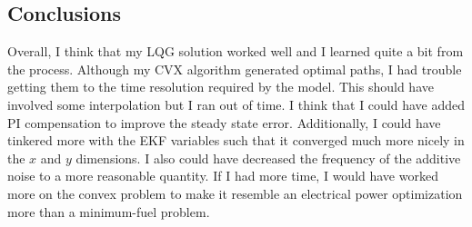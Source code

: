 \documentclass[conf]{new-aiaa}
\begin{document}
\begin{doublespace}
\section{Conclusions}
Overall, I think that my LQG solution worked well and I learned quite a bit from the process. Although my CVX algorithm generated optimal paths, I had trouble getting them to the time resolution required by the model. This should have involved some interpolation but I ran out of time. I think that I could have added PI compensation to improve the steady state error. Additionally, I could have tinkered more with the EKF variables such that it converged much more nicely in the $x$ and $y$ dimensions. I also could have decreased the frequency of the additive noise to a more reasonable quantity. If I had more time, I would have worked more on the convex problem to make it resemble an electrical power optimization more than a minimum-fuel problem. 


\clearpage
\end{doublespace}

\end{document}
